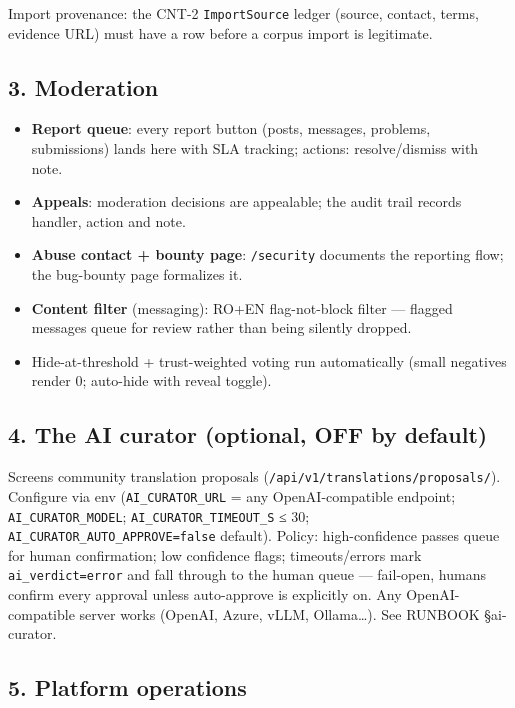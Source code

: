 \documentclass[
]{article}
\providecommand{\tightlist}{%
  \setlength{\itemsep}{0pt}\setlength{\parskip}{0pt}}
\begin{document}
Import provenance: the CNT-2 \texttt{ImportSource} ledger (source,
contact, terms, evidence URL) must have a row before a corpus import is
legitimate.

\subsection{3. Moderation}\label{3-moderation}

\begin{itemize}
\tightlist
\item
  \textbf{Report queue}: every report button (posts, messages, problems,
  submissions) lands here with SLA tracking; actions: resolve/dismiss
  with note.
\item
  \textbf{Appeals}: moderation decisions are appealable; the audit trail
  records handler, action and note.
\item
  \textbf{Abuse contact + bounty page}: \texttt{/security} documents the
  reporting flow; the bug-bounty page formalizes it.
\item
  \textbf{Content filter} (messaging): RO+EN flag-not-block filter ---
  flagged messages queue for review rather than being silently dropped.
\item
  Hide-at-threshold + trust-weighted voting run automatically (small
  negatives render 0; auto-hide with reveal toggle).
\end{itemize}

\subsection{4. The AI curator (optional, OFF by
default)}\label{4-the-ai-curator-optional-off-by-default}

Screens community translation proposals
(\texttt{/api/v1/translations/proposals/}). Configure via env
(\texttt{AI\_CURATOR\_URL} = any OpenAI-compatible endpoint;
\texttt{AI\_CURATOR\_MODEL}; \texttt{AI\_CURATOR\_TIMEOUT\_S} ≤ 30;
\texttt{AI\_CURATOR\_AUTO\_APPROVE=false} default). Policy:
high-confidence passes queue for human confirmation; low confidence
flags; timeouts/errors mark \texttt{ai\_verdict=error} and fall through
to the human queue --- fail-open, humans confirm every approval unless
auto-approve is explicitly on. Any OpenAI-compatible server works
(OpenAI, Azure, vLLM, Ollama\ldots). See RUNBOOK §ai-curator.

\subsection{5. Platform operations}\label{5-platform-operations}
\end{document}
